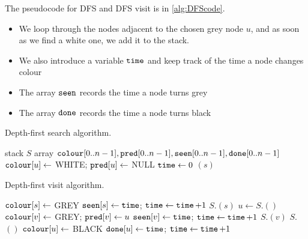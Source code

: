 The pseudocode for DFS and DFS visit is in \cref{alg:DFScode}. 

\begin{itemize}
\item We loop through the nodes adjacent to the chosen grey node
$u$, and as soon as we find a white one, we add it to the stack.
\item We also introduce a variable $\timeVar$ and keep track of the time a node changes colour
\item The array $\seen$ records the time a node turns grey
\item The array  $\done$ records the time a node turns black
\end{itemize}

\begin{algorithm}[H]
  \caption{Depth-first search algorithm.}
    \label{alg:DFScode}
\begin{algorithmic}[1]
	\State stack $S$  
	\State array $\colour[0..n-1], \pred[0..n-1], \seen[0..n-1], \done[0..n-1]$
		\State $\colour[u] \gets $ WHITE; $\pred[u] \gets $ NULL
	\EndFor
	\State $\timeVar \gets 0$
			\State {}$(s)$
		\EndIf
	\EndFor
	\State \Return{$\pred, \seen, \done$}
\EndFunction
\end{algorithmic}
\end{algorithm}

\begin{algorithm}[H]
  \caption{Depth-first visit algorithm.}
    \label{alg:DFSvisitcode}
\begin{algorithmic}[1]
	\State $\colour[s] \gets $ GREY
	\State $\seen[s] \gets \timeVar$; $\timeVar \gets \timeVar + 1$
	\State $S$.$(s)$
		\State $u \gets S$.$()$
			\State $\colour[v] \gets $ GREY; $\pred[v] \gets u$
			\State $\seen[v] \gets \timeVar$; $\timeVar \gets \timeVar + 1$
			\State $S$.$(v)$
		\Else
			\State $S$.$()$
			\State $\colour[u] \gets $ BLACK
			\State $\done[u] \gets \timeVar$; $\timeVar \gets \timeVar + 1$
		\EndIf
	\EndWhile
\EndFunction
\end{algorithmic}
\end{algorithm}


